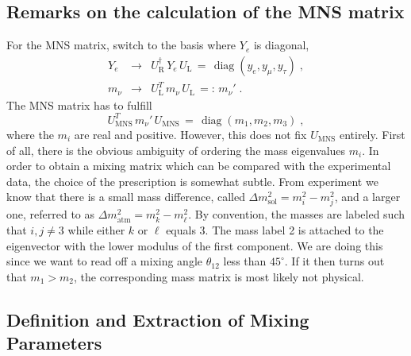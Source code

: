 \documentclass[12pt,a4paper,twoside]{scrartcl}
\DeclareMathOperator{\diag}{diag}
\numberwithin{equation}{section}
\numberwithin{table}{section}
\begin{document}
\subsection{Remarks on the calculation of the MNS matrix}
\label{sec:RemarksMNS}

For the MNS matrix, switch to the basis where $Y_e$ is diagonal,
\begin{subequations}
\begin{eqnarray}
 Y_e & \to & U_\mathrm{R}^\dagger\,Y_e\,U_\mathrm{L} 
 \,=\,\diag(y_e,y_\mu,y_\tau)\;,\\
 m_\nu & \to & U_\mathrm{L}^T\,m_\nu\,U_\mathrm{L}
 \,=:\,m_\nu'\;.
\end{eqnarray}
\end{subequations} 
The MNS matrix has to fulfill
\begin{equation}
 U_\mathrm{MNS}^T\,m_\nu'\,U_\mathrm{MNS}
 \,=\,
 \diag(m_1,m_2,m_3)\;,
\end{equation}
where the $m_i$ are real and positive. However, this does not fix
$U_\mathrm{MNS}$ entirely. First of all, there is the obvious ambiguity of
ordering the mass eigenvalues $m_i$. In order to obtain a mixing matrix which
can be compared with the experimental data,  the choice of the prescription is
somewhat subtle. From experiment we know that there is a small mass difference,
called $\Delta m^2_\mathrm{sol}=m_i^2-m_j^2$, and a larger one, referred to as 
$\Delta m^2_\mathrm{atm}=m_k^2 - m_\ell^2$. By convention, the masses are
labeled such that $i,j\ne 3$ while either $k$ or $\ell$ equals 3.  The mass
label 2 is attached to the eigenvector with the lower modulus of the first
component. We are doing this since we want to read off a mixing angle
$\theta_{12}$ less than $45^\circ$. If it then turns out that $m_1>m_2$, the
corresponding mass matrix is most likely not physical.


\subsection{Definition and Extraction of Mixing Parameters}
\label{app:MixingParameters}
\end{document}
